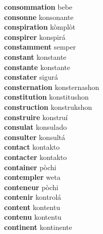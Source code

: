 \textbf{consommation } bebe \\
\textbf{consonne } konsonante \\
\textbf{conspiration } kòmplòt \\
\textbf{conspirer } konspirá \\
\textbf{constamment } semper \\
\textbf{constant } konstante \\
\textbf{constante } konstante \\
\textbf{constater } sigurá \\
\textbf{consternation } konsternashon \\
\textbf{constitution } konstitushon \\
\textbf{construction } konstrukshon \\
\textbf{construire } konstruí \\
\textbf{consulat } konsulado \\
\textbf{consulter } konsultá \\
\textbf{contact } kontakto \\
\textbf{contacter } kontakto \\
\textbf{container } pòchi \\
\textbf{contempler } weta \\
\textbf{conteneur } pòchi \\
\textbf{contenir } kontrolá \\
\textbf{content } kontentu \\
\textbf{contenu } kontentu \\
\textbf{continent } kontinente \\
